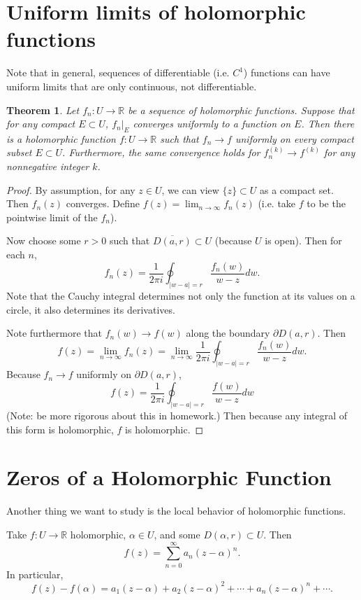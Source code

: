 \documentclass{artikel3}
\newcommand{\abs}[1]{\left|#1\right|}
\newcommand{\complex}{\mathbb{R}}
\newcommand{\del}{\partial}
\newtheorem{thm}{Theorem}
\numberwithin{equation}{enumi}
\begin{document}
\section{Uniform limits of holomorphic functions}

Note that in general, sequences of differentiable (i.e. $C^1$) functions
can have uniform limits that are only continuous, not differentiable.

\begin{thm}
	Let $f_n:U\to \complex$ be a sequence of holomorphic functions.
	Suppose that for any compact $E\subset U$, $f_n|_E$ converges uniformly
	to a function on $E$.  Then there is a holomorphic function $f:U\to\complex$
	such that $f_n\to f$ uniformly on every compact subset $E\subset U$.
	Furthermore, the same convergence holds for $f_n^{(k)}\to f^{(k)}$
	for any nonnegative integer $k$.
\end{thm}
\begin{proof}
	By assumption, for any $z\in U$, we can view $\{z\}\subset U$ as a compact
	set.  Then $f_n(z)$ converges.  Define $f(z)=\lim_{n\to\infty}f_n(z)$
	(i.e. take $f$ to be the pointwise limit of the $f_n$).

	Now choose some $r>0$ such that $\overline{D(a,r)}\subset U$
	(because $U$ is open).  Then for each $n$, \[
		f_n(z)=\frac{1}{2\pi i}\oint_{\abs{w-a}=r}\frac{f_n(w)}{w-z}dw.
	\] Note that the Cauchy integral determines not only the function
	at its values on a circle, it also determines its derivatives.
	
	Note furthermore that $f_n(w)\to f(w)$ along the boundary $\del D(a,r)$.
	Then \[
		f(z)=\lim_{n\to\infty}f_n(z)=\lim_{n\to\infty}\frac{1}{2\pi i}\oint_{\abs{w-a}=r}\frac{f_n(w)}{w-z}dw.
	\] Because $f_n\to f$ uniformly on $\del D(a,r)$, \[
		f(z)=\frac{1}{2\pi i}\oint_{\abs{w-a}=r}\frac{f(w)}{w-z}dw
	\] (Note: be more rigorous about this in homework.)  Then because
	any integral of this form is holomorphic, $f$ is holomorphic.
\end{proof}

\section{Zeros of a Holomorphic Function}
Another thing we want to study is the local behavior of holomorphic
functions.

Take $f:U\to\complex$ holomorphic, $\alpha\in U$, and some $D(\alpha,r)\subset U$.
Then \[
	f(z)=\sum_{n=0}^\infty a_n(z-\alpha)^n.
\] In particular, \[
	f(z)-f(\alpha)=a_1(z-\alpha)+a_2(z-\alpha)^2+\cdots +a_n(z-\alpha)^n+\cdots.
\]
\end{document}
